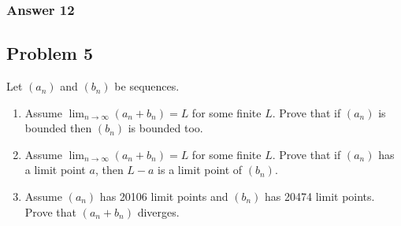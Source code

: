 \documentclass[11pt]{article}
\begin{document}
\subsubsection{Answer 12}
\label{sec-1-4-3}
\subsection{Problem 5}
\label{sec-1-5}
Let $(a_n)$ and $(b_n)$ be sequences.
\begin{enumerate}
\item Assume $\lim_{n \to \infty}(a_n + b_n) = L$ for some finite $L$.
Prove that if $(a_n)$ is bounded then $(b_n)$ is bounded too.
\item Assume $\lim_{n \to \infty}(a_n + b_n) = L$ for some finite $L$.
Prove that if $(a_n)$ has a limit point $a$, then $L - a$ is a
limit point of $(b_n)$.
\item Assume $(a_n)$ has 20106 limit points and $(b_n)$ has 20474 limit
points. Prove that $(a_n + b_n)$ diverges.
\end{enumerate}
\end{document}
